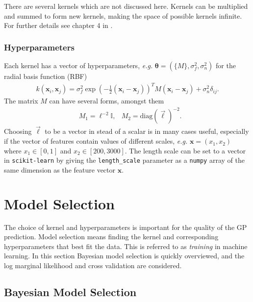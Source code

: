 \documentclass[twoside,english]{uiofysmaster}
\begin{document}
There are several kernels which are not discussed here. Kernels can be multiplied and summed to form new kernels, making the space of possible kernels infinite. For further details see chapter 4 in \cite{rasmussen2006gaussian}.





\subsubsection{Hyperparameters}

Each kernel has a vector of hyperparameters, \textit{e.g.} $\boldsymbol{\theta} = (\{M\}, \sigma^2_f, \sigma_n^2)$ for the radial basis function (RBF)
\begin{align}
k(\textbf{x}_i, \textbf{x}_j) = \sigma_f^2 \exp (- \frac{1}{2} (\textbf{x}_i - \textbf{x}_j))^T M (\textbf{x}_i - \textbf{x}_j) + \sigma_n^2 \delta_{ij}.
\end{align}
The matrix $M$ can have several forms, amongst them
\begin{align}
&M_1 = \ell^{-2} \mathbb{I} , &M_2 = \text{diag}(\vec{\ell})^{-2}.
\end{align}
Choosing $\vec{\ell}$ to be a vector in stead of a scalar is in many cases useful, especially if the vector of features contain values of different scales, \textit{e.g.} $\textbf{x} = (x_1, x_2)$ where $x_1 \in [0, 1]$ and $x_2 \in [200, 3000]$. The length scale can be set to a vector in \verb|scikit-learn| by giving the \verb|length_scale| parameter as a \verb|numpy| array of the same dimension as the feature vector $\textbf{x}$.



\section{Model Selection}

The choice of kernel and hyperparameters is important for the quality of the GP prediction. Model selection means finding the  kernel and corresponding hyperparameters that best fit the data. This is referred to as \textit{training} in machine learning. In this section Bayesian model selection is quickly overviewed, and the log marginal likelihood and cross validation are considered.

\subsection{Bayesian Model Selection}
\end{document}
